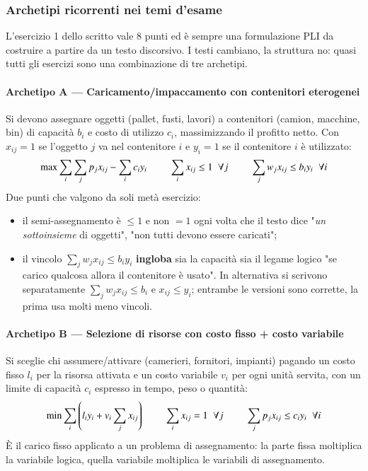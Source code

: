 \documentclass[12pt]{extarticle} %
\begin{document}
\subsubsection{Archetipi ricorrenti nei temi d'esame}
L'esercizio 1 dello scritto vale 8 punti ed è sempre una formulazione PLI da costruire a partire da un testo discorsivo. I testi cambiano, la struttura no: quasi tutti gli esercizi sono una combinazione di tre archetipi.

\paragraph{Archetipo A --- Caricamento/impaccamento con contenitori eterogenei}
Si devono assegnare oggetti (pallet, fusti, lavori) a contenitori (camion, macchine, bin) di capacità $b_i$ e costo di utilizzo $c_i$, massimizzando il profitto netto. Con $x_{ij}=1$ se l'oggetto $j$ va nel contenitore $i$ e $y_i=1$ se il contenitore $i$ è utilizzato:
\[
\max \sum_i \sum_j p_j x_{ij} - \sum_i c_i y_i
\hspace{0.8cm}
\sum_i x_{ij} \le 1 \;\; \forall j
\hspace{0.8cm}
\sum_j w_j x_{ij} \le b_i y_i \;\; \forall i
\]
Due punti che valgono da soli metà esercizio:
\begin{itemize}
    \item il semi-assegnamento è $\le 1$ e non $=1$ ogni volta che il testo dice "\textit{un sottoinsieme} di oggetti", "non tutti devono essere caricati";
    \item il vincolo $\sum_j w_j x_{ij} \le b_i y_i$ \textbf{ingloba} sia la capacità sia il legame logico "se carico qualcosa allora il contenitore è usato". In alternativa si scrivono separatamente $\sum_j w_j x_{ij} \le b_i$ e $x_{ij}\le y_i$; entrambe le versioni sono corrette, la prima usa molti meno vincoli.
\end{itemize}

\paragraph{Archetipo B --- Selezione di risorse con costo fisso + costo variabile}
Si sceglie chi assumere/attivare (camerieri, fornitori, impianti) pagando un costo fisso $l_i$ per la risorsa attivata e un costo variabile $v_i$ per ogni unità servita, con un limite di capacità $c_i$ espresso in tempo, peso o quantità:
\[
\min \sum_i \left( l_i y_i + v_i \sum_j x_{ij}\right)
\hspace{0.8cm}
\sum_i x_{ij} = 1 \;\; \forall j
\hspace{0.8cm}
\sum_j p_j x_{ij} \le c_i y_i \;\; \forall i
\]
È il carico fisso applicato a un problema di assegnamento: la parte fissa moltiplica la variabile logica, quella variabile moltiplica le variabili di assegnamento.
\end{document}
